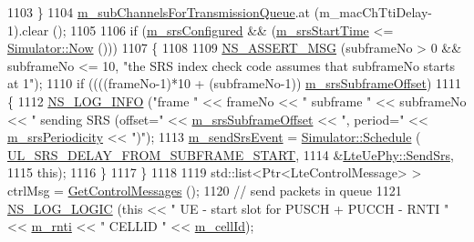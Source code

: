\begin{DoxyCode}
1103         \}
1104       \hyperlink{classns3_1_1LteUePhy_a552aae33d3ca8d710bcb83b7aaeb2844}{m\_subChannelsForTransmissionQueue}.at (m\_macChTtiDelay-1).clear ();
1105 
1106       \textcolor{keywordflow}{if} (\hyperlink{classns3_1_1LteUePhy_a7dfdd1f166251b84e6c09f3a3544b37d}{m\_srsConfigured} && (\hyperlink{classns3_1_1LteUePhy_a3089833b065ffedfcd904c9cbbae2797}{m\_srsStartTime} <= 
      \hyperlink{classns3_1_1Simulator_ac3178fa975b419f7875e7105be122800}{Simulator::Now} ()))
1107         \{
1108 
1109           \hyperlink{assert_8h_aff5ece9066c74e681e74999856f08539}{NS\_ASSERT\_MSG} (subframeNo > 0 && subframeNo <= 10, \textcolor{stringliteral}{"the SRS index check code assumes
       that subframeNo starts at 1"});
1110           \textcolor{keywordflow}{if} ((((frameNo-1)*10 + (subframeNo-1)) %
      \hyperlink{classns3_1_1LteUePhy_a77622b44194738763420372573b7a176}{m\_srsSubframeOffset})
1111             \{
1112               \hyperlink{group__logging_gafbd73ee2cf9f26b319f49086d8e860fb}{NS\_LOG\_INFO} (\textcolor{stringliteral}{"frame "} << frameNo << \textcolor{stringliteral}{" subframe "} << subframeNo << \textcolor{stringliteral}{" sending SRS
       (offset="} << \hyperlink{classns3_1_1LteUePhy_a77622b44194738763420372573b7a176}{m\_srsSubframeOffset} << \textcolor{stringliteral}{", period="} << 
      \hyperlink{classns3_1_1LteUePhy_a295824339c8549dc05048bc96b8a4c6e}{m\_srsPeriodicity} << \textcolor{stringliteral}{")"});
1113               \hyperlink{classns3_1_1LteUePhy_aa5d34457c03a8a5d276546f800b41ab6}{m\_sendSrsEvent} = \hyperlink{classns3_1_1Simulator_a671882c894a08af4a5e91181bf1eec13}{Simulator::Schedule} (
      \hyperlink{namespacens3_a85ae230963eb2180511edbe90b9b6a22}{UL\_SRS\_DELAY\_FROM\_SUBFRAME\_START}, 
1114                                                     &\hyperlink{classns3_1_1LteUePhy_af5e670e16b13fbb9368f75bedf199067}{LteUePhy::SendSrs},
1115                                                     \textcolor{keyword}{this});
1116             \}
1117         \}
1118 
1119       std::list<Ptr<LteControlMessage> > ctrlMsg = \hyperlink{classns3_1_1LtePhy_acd957b791ce9b6181b05add134061a67}{GetControlMessages} ();
1120       \textcolor{comment}{// send packets in queue}
1121       \hyperlink{group__logging_ga88acd260151caf2db9c0fc84997f45ce}{NS\_LOG\_LOGIC} (\textcolor{keyword}{this} << \textcolor{stringliteral}{" UE - start slot for PUSCH + PUCCH - RNTI "} << 
      \hyperlink{classns3_1_1LteUePhy_a887b5dc4e246a308cd09127b64ed8fac}{m\_rnti} << \textcolor{stringliteral}{" CELLID "} << \hyperlink{classns3_1_1LtePhy_ac53d10d27f1bde64807a3ff366662787}{m\_cellId});

\end{DoxyCode}
